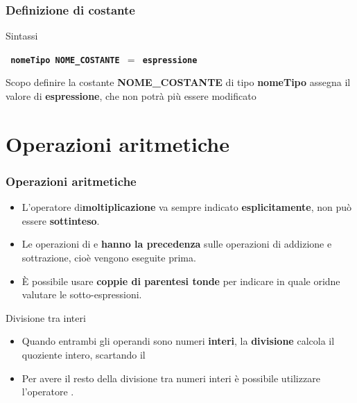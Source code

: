 \begin{frame}
\frametitle{Definizione di costante}
\begin{block}{Sintassi}
\begin{center}
\texttt{ \textbf{nomeTipo NOME\_COSTANTE $=$ espressione}\textCl{;}}
\end{center}
\end{block}
\begin{block}{Scopo}
definire la costante \textbf{NOME\_COSTANTE} di tipo \textbf{nomeTipo} assegna il valore di \textbf{espressione}, che non potrà più
essere modificato
\end{block}
\end{frame}

\section*{Operazioni aritmetiche}
\begin{frame}
\frametitle{Operazioni aritmetiche}
\begin{block}{}
\begin{itemize}
\item L'operatore di\textbf{moltiplicazione} va sempre indicato \textbf{esplicitamente}, non può essere \textbf{sottinteso}.
\item Le operazioni di  e  \textbf{hanno la precedenza} sulle operazioni di 
\alert{addizione} e \alert{sottrazione}, cioè vengono eseguite prima.
\item \`E possibile usare \textbf{coppie di parentesi tonde} per indicare in quale oridne valutare le sotto-espressioni.
\end{itemize}
\end{block}
\begin{block}{Divisione tra interi}
\begin{itemize}
\item Quando entrambi gli operandi sono numeri \textbf{interi}, la \textbf{divisione} calcola il \alert{quoziente intero},
scartando il 
\item Per avere il resto della divisione tra numeri interi è possibile utilizzare l'operatore \textCl{\%}.
\end{itemize}
\end{block}
\end{frame}

